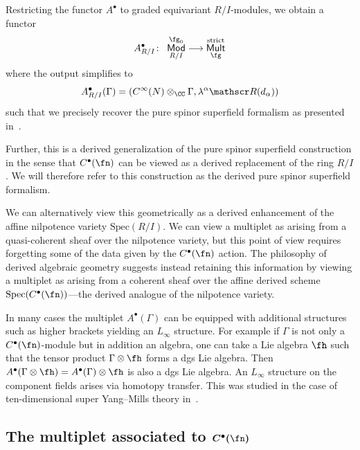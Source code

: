 \documentclass[10pt,a4paper]{amsart}
\numberwithin{equation}{section}
\def\cat#1{\ensuremath{\mathsf{#1}}}
\DeclareMathOperator{\Mod}{\cat{Mod}}
\DeclareMathOperator{\Mult}{\cat{Mult}}
\def\sR{\mathscr R}
\begin{document}
Restricting the functor $A^\bullet$ to graded equivariant $R/I$-modules, we obtain a functor
\begin{equation*}
A^\bullet_{R/I} \colon \ \Mod_{R/I}^{\fg_0} \longrightarrow \Mult_{\fg}^{\mathrm{strict}}
\end{equation*}
where the output simplifies to
\begin{equation*}
A^\bullet_{R/I} (\Gamma) = \left( C^\infty(N) \otimes_\CC \Gamma , \lambda^\alpha \sR(d_\alpha) \right)
\end{equation*}
such that we precisely recover the pure spinor superfield formalism as presented in~\cite{perspectives}.

Further, this is a derived generalization of the pure spinor superfield construction in the sense that $C^\bullet(\fn)$ can be viewed as a derived replacement of the ring $R/I$. We will therefore refer to this construction as the derived pure spinor superfield formalism.

\begin{rmk}
	We can alternatively view this geometrically as a derived enhancement of the affine nilpotence variety $\mathrm{Spec}(R/I)$. We can view a multiplet as arising from a quasi-coherent sheaf over the nilpotence variety, but this point of view requires forgetting some of the data given by the $C^\bullet(\fn)$ action. The philosophy of derived algebraic geometry suggests instead retaining this information by viewing a multiplet as arising from a coherent sheaf over the affine derived scheme $\mathrm{Spec}(C^\bullet(\fn))$---the derived analogue of the nilpotence variety.
\end{rmk}

\begin{rmk}
	In many cases the multiplet $A^\bullet(\Gamma)$ can be equipped with additional structures such as higher brackets yielding an $L_\infty$ structure. For example if $\Gamma$ is not only a $C^\bullet(\fn)$-module but in addition an algebra, one can take a Lie algebra $\fh$ such that the tensor product $\Gamma \otimes \fh$ forms a dgs Lie algebra. Then $A^\bullet(\Gamma \otimes \fh) = A^\bullet(\Gamma) \otimes \fh$ is also a dgs Lie algebra. An $L_\infty$ structure on the component fields arises via homotopy transfer. This was studied in the case of ten-dimensional super Yang--Mills theory in~\cite{AKLL, perspectives}.
\end{rmk}

\subsection[The multiplet associated to C\^{}bullet(n)]{The multiplet associated to $\boldsymbol{C^\bullet(\fn)}$} \label{sec: forms}
\end{document}
